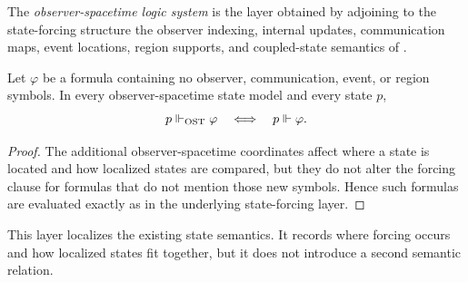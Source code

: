 \begin{definition}\label{def:ost-system}
The \emph{observer-spacetime logic system} is the layer obtained by adjoining to the state-forcing structure the observer indexing, internal updates, communication maps, event locations, region supports, and coupled-state semantics of .
\end{definition}

\begin{proposition}\label{prop:ost-conservative}
Let $\varphi$ be a formula containing no observer, communication, event, or region symbols. In every observer-spacetime state model and every state $p$,
\[
p\Vdash_{\mathrm{OST}}\varphi
\quad\Longleftrightarrow\quad
p\Vdash\varphi.
\]
\end{proposition}

\begin{proof}
The additional observer-spacetime coordinates affect where a state is located and how localized states are compared, but they do not alter the forcing clause for formulas that do not mention those new symbols. Hence such formulas are evaluated exactly as in the underlying state-forcing layer.
\end{proof}

This layer localizes the existing state semantics. It records where forcing occurs and how localized states fit together, but it does not introduce a second semantic relation.
